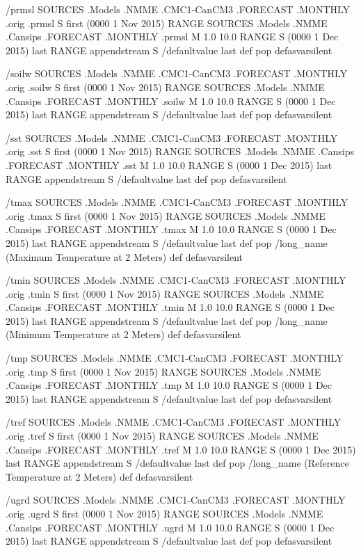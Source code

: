 \begin{ingrid}
/prmsl {
 SOURCES .Models .NMME .CMC1-CanCM3 .FORECAST .MONTHLY .orig .prmsl 
S first (0000 1 Nov 2015) RANGE
 SOURCES .Models .NMME .Cansips .FORECAST .MONTHLY .prmsl
 M 1.0 10.0 RANGE
S (0000 1 Dec 2015) last RANGE
appendstream
S /defaultvalue last def pop
} defasvarsilent

/soilw {
SOURCES .Models .NMME .CMC1-CanCM3 .FORECAST .MONTHLY .orig .soilw
S first (0000 1 Nov 2015) RANGE
SOURCES .Models .NMME .Cansips .FORECAST .MONTHLY .soilw
M 1.0 10.0 RANGE
S (0000 1 Dec 2015) last RANGE
appendstream
S /defaultvalue last def pop
} defasvarsilent

/sst {
 SOURCES .Models .NMME .CMC1-CanCM3 .FORECAST .MONTHLY .orig .sst 
S first (0000 1 Nov 2015) RANGE
 SOURCES .Models .NMME .Cansips .FORECAST .MONTHLY .sst
 M 1.0 10.0 RANGE
S (0000 1 Dec 2015) last RANGE
appendstream
S /defaultvalue last def pop
} defasvarsilent

/tmax {
 SOURCES .Models .NMME .CMC1-CanCM3 .FORECAST .MONTHLY .orig .tmax 
S first (0000 1 Nov 2015) RANGE
 SOURCES .Models .NMME .Cansips .FORECAST .MONTHLY .tmax
 M 1.0 10.0 RANGE
S (0000 1 Dec 2015) last RANGE
appendstream
S /defaultvalue last def pop
/long_name (Maximum Temperature at 2 Meters) def
} defasvarsilent

/tmin {
 SOURCES .Models .NMME .CMC1-CanCM3 .FORECAST .MONTHLY .orig .tmin 
S first (0000 1 Nov 2015) RANGE
 SOURCES .Models .NMME .Cansips .FORECAST .MONTHLY .tmin
 M 1.0 10.0 RANGE
S (0000 1 Dec 2015) last RANGE
appendstream
S /defaultvalue last def pop
/long_name (Minimum Temperature at 2 Meters) def
} defasvarsilent

/tmp {
 SOURCES .Models .NMME .CMC1-CanCM3 .FORECAST .MONTHLY .orig .tmp 
S first (0000 1 Nov 2015) RANGE
 SOURCES .Models .NMME .Cansips .FORECAST .MONTHLY .tmp
 M 1.0 10.0 RANGE
S (0000 1 Dec 2015) last RANGE
appendstream
S /defaultvalue last def pop
} defasvarsilent

/tref {
 SOURCES .Models .NMME .CMC1-CanCM3 .FORECAST .MONTHLY .orig .tref 
S first (0000 1 Nov 2015) RANGE
 SOURCES .Models .NMME .Cansips .FORECAST .MONTHLY .tref
 M 1.0 10.0 RANGE
S (0000 1 Dec 2015) last RANGE
appendstream
S /defaultvalue last def pop
/long_name (Reference Temperature at 2 Meters) def
} defasvarsilent

/ugrd {
 SOURCES .Models .NMME .CMC1-CanCM3 .FORECAST .MONTHLY .orig .ugrd 
S first (0000 1 Nov 2015) RANGE
 SOURCES .Models .NMME .Cansips .FORECAST .MONTHLY .ugrd
 M 1.0 10.0 RANGE
S (0000 1 Dec 2015) last RANGE
appendstream
S /defaultvalue last def pop
} defasvarsilent


\end{ingrid}

